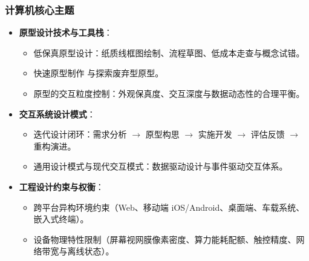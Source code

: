 \subsubsection{计算机核心主题}
\begin{itemize}
    \item \textbf{原型设计技术与工具栈}：
    \begin{itemize}
        \item 低保真原型设计：纸质线框图绘制、流程草图、低成本走查与概念试错。
        \item 快速原型制作 与探索废弃型原型。
        \item 原型的交互粒度控制：外观保真度、交互深度与数据动态性的合理平衡。
    \end{itemize}
    \item \textbf{交互系统设计模式}：
    \begin{itemize}
        \item 迭代设计闭环：需求分析 $\to$ 原型构思 $\to$ 实施开发 $\to$ 评估反馈 $\to$ 重构演进。
        \item 通用设计模式与现代交互模式：数据驱动设计与事件驱动交互体系。
    \end{itemize}
    \item \textbf{工程设计约束与权衡}：
    \begin{itemize}
        \item 跨平台异构环境约束（Web、移动端 iOS/Android、桌面端、车载系统、嵌入式终端）。
        \item 设备物理特性限制（屏幕视网膜像素密度、算力能耗配额、触控精度、网络带宽与离线状态）。
    \end{itemize}
\end{itemize}

